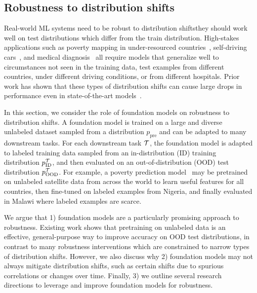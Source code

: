 \newsection
\subsection{Robustness to distribution shifts} 
\label{sec:robustness}

Real-world ML systems need to be robust to distribution shifts\dash{}they should work well on test distributions which differ from the train distribution.
High-stakes applications such as poverty mapping in under-resourced countries~\citep{xie2016transfer,jean2016combining}, self-driving cars~\citep{yu2020bdd100k,sun2020scalability}, and medical diagnosis~\citep{ albadawy2018tumor,dai2018dark} all require models that generalize well to circumstances not seen in the training data,
\eg test examples from different countries, under different driving conditions, or from different hospitals.
Prior work has shown that these types of distribution shifts can cause large drops in performance even in state-of-the-art models~\citep{blitzer2006domain,daume07easyadapt,sugiyama2007covariate,ganin2015domain,peng2019moment,kumar2020gradual,arjovsky2019invariant,szegedy2014intriguing,hendrycks2019benchmarking,sagawa2020group,recht2019doimagenet,abney2007semisup,ruder2018strong,geirhos2018generalisation,kumar2020conservative,yu2020mopo,geirhos2020shortcut,xie2021innout,koh2021wilds}. 

\newcommand\ppre{p_{\text{pre}}}
\newcommand\ptrain{p^{\sT}_{\text{ID}}}
\newcommand\ptest{p^{\sT}_{\text{OOD}}}


In this section, we consider the role of foundation models on robustness to distribution shifts. A foundation model is trained on a large and diverse unlabeled dataset sampled from a distribution $\ppre$ and can be adapted to many downstream tasks.
For each downstream task $\mathcal{T}$, the foundation model is adapted to labeled training data sampled from an in-distribution (ID) training distribution $\ptrain$, and then evaluated on an out-of-distribution (OOD) test distribution $\ptest$.
For example, a poverty prediction model~\citep{xie2016transfer,jean2016combining} may be pretrained on unlabeled satellite data from across the world to learn useful features for all countries, then fine-tuned on labeled examples from Nigeria, and finally evaluated in Malawi where labeled examples are scarce.

We argue that 1) foundation models are a particularly promising approach to robustness. Existing work shows that pretraining on unlabeled data is an effective, general-purpose way to improve accuracy on OOD test distributions, in contrast to many robustness interventions which are constrained to narrow types of distribution shifts. However, we also discuss why 2) foundation models may not always mitigate distribution shifts, such as certain shifts due to spurious correlations or changes over time. Finally, 3) we outline several research directions to leverage and improve foundation models for robustness.

